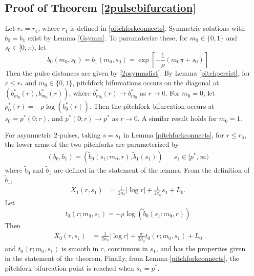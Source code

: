 \documentclass[thesis.tex]{subfiles}
\begin{document}
\subsection{Proof of Theorem \ref{2pulsebifurcation}}

Let $r_* = r_4$, where $r_4$ is defined in \cref{pitchforkconnects}. Symmetric solutions with $b_0 = b_1$ exist by Lemma \ref{Gsymm}. To paramaterize these, for $m_0 \in \{0, 1\}$ and $s_0 \in [0, \pi)$, let
\[
b_0(m_0, s_0) = b_1(m_0, s_0) = 
\exp\left[ -\frac{1}{\rho}(m_0 \pi + s_0) \right]
\]
Then the pulse distances are given by \cref{2psymmdist}. By Lemma \ref{pitchpersist}, for $r \leq r_*$ and $m_0 \in \{0,1\}$, pitchfork bifurcations occurs on the diagonal at $(b_{m_0}^*(r), b_{m_0}^*(r))$, where $b_{m_0}^*(r) \rightarrow b_{m_0}^*$ as $r \rightarrow 0$. For $m_0 = 0$, let $p_0^*(r) = -\rho \log(b_0^*(r))$. Then the pitchfork bifurcation occurs at $s_0 = p^*(0; r)$, and $p^*(0; r) \rightarrow p^*$ as $r \rightarrow 0$. A similar result holds for $m_0 = 1$.

For asymmetric 2-pulses, taking $s = s_1$ in Lemma \ref{pitchforkconnects}, for $r \leq r_4$, the lower arms of the two pitchforks are parameterized by
\begin{align*}
(b_0, b_1) = (\tilde{b}_0(s_1; m_0, r), \tilde{b}_1(s_1)) && s_1 \in [p^*, \infty)
\end{align*}
where $\tilde{b}_0$ and $\tilde{b}_1$ are defined in the statement of the lemma. From the definition of $\tilde{b}_1$, 
\begin{align*}
X_1(r, s_1) &= \frac{1}{2 \alpha_0} |\log r| + \frac{1}{2\beta_0} s_1 + L_0.
\end{align*}
Let 
\[
t_0(r; m_0, s_1) = -\rho \log\left( \tilde{b}_0(s_1; m_0, r) \right)
\]
Then 
\begin{align*}
X_0(r, s_1) &= \frac{1}{2 \alpha_0} |\log r| + \frac{\pi}{2\beta_0} t_0(r; m_0, s_1) + L_0
\end{align*}
and $t_0(r; m_0, s_1)$ is smooth in $r$, continuous in $s_1$, and has the properties given in the statement of the theorem. Finally, from Lemma \ref{pitchforkconnects}, the pitchfork bifurcation point is reached when $s_1 = p^*$.

\iffulldocument\else
	
	
\fi
\end{document}
